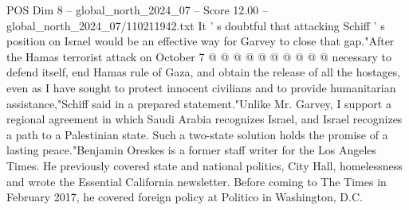 \begin{textsample}{POS Dim 8 – global\_north\_2024\_07 – Score 12.00 – global\_north\_2024\_07/110211942.txt}
It ' s doubtful that attacking Schiff ' s position on Israel would be an effective way for Garvey to close that gap."After the Hamas terrorist attack on October 7 @ @ @ @ @ @ @ @ @ @ necessary to defend itself, end Hamas rule of Gaza, and obtain the release of all the hostages, even as I have sought to protect innocent civilians and to provide humanitarian assistance,"Schiff said in a prepared statement."Unlike Mr.
Garvey, I support a regional agreement in which Saudi Arabia recognizes Israel, and Israel recognizes a path to a Palestinian state.
Such a two-state solution holds the promise of a lasting peace."Benjamin Oreskes is a former staff writer for the Los Angeles Times.
He previously covered state and national politics, City Hall, homelessness and wrote the Essential California newsletter.
Before coming to The Times in February 2017, he covered foreign policy at Politico in Washington, D.C.

\end{textsample}
